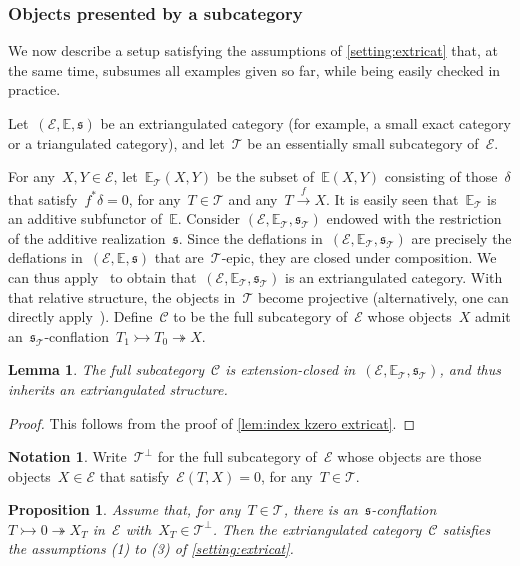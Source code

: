 \documentclass{amsart}
\newtheorem{proposition}[theorem]{Proposition}
\newtheorem{lemma}[theorem]{Lemma}
\theoremstyle{definition}
\newtheorem{notation}[theorem]{Notation}
\newcommand{\cat}{\mathcal{C}}
\newcommand{\tc}{\mathcal{T}}
\newcommand{\ec}{\mathcal{E}}
\newcommand{\infl}{\rightarrowtail}
\newcommand{\defl}{\twoheadrightarrow}
\begin{document}
\subsubsection{Objects presented by a subcategory}
\label{sec:prT}

We now describe a setup satisfying the assumptions of \cref{setting:extricat} that, at the same time, subsumes all examples given so far, while being easily checked in practice.

Let~$(\ec,\mathbb{E},\mathfrak{s})$ be an extriangulated category (for example, a small exact category or a triangulated category), and let~$\tc$ be an essentially small subcategory of~$\ec$.

For any~$X,Y\in\ec$, let~$\mathbb{E}_\tc(X,Y)$ be the subset of~$\mathbb{E}(X,Y)$ consisting of those~$\delta$ that satisfy~$f^\ast\delta = 0$, for any~$T\in\tc$ and any~$T\xrightarrow{f}X$.
It is easily seen that~$\mathbb{E}_\tc$ is an additive subfunctor of~$\mathbb{E}$.
Consider $(\ec,\mathbb{E}_\tc,\mathfrak{s}_\tc)$ endowed with the restriction of the additive realization~$\mathfrak{s}$.
Since the deflations in~$(\ec,\mathbb{E}_\tc,\mathfrak{s}_\tc)$ are precisely the deflations in~$(\ec,\mathbb{E},\mathfrak{s})$ that are~$\tc$-epic, they are closed under composition.
We can thus apply~\cite[Prop.~3.16]{HerschendLiuNakaokaI} to obtain that~$(\ec,\mathbb{E}_\tc,\mathfrak{s}_\tc)$ is an extriangulated category.
With that relative structure, the objects in~$\tc$ become projective
(alternatively, one can directly apply~\cite[Prop.~3.19]{HerschendLiuNakaokaI}).
Define~$\cat$ to be the full subcategory of~$\ec$ whose objects~$X$ admit an~$\mathfrak{s}_\tc$-conflation~$T_1\infl T_0\defl X$.

\begin{lemma}
\label{lem: prT is extriangulated}
The full subcategory~$\cat$ is extension-closed in~$(\ec,\mathbb{E}_\tc,\mathfrak{s}_\tc)$, and thus inherits an extriangulated structure.
\end{lemma}

\begin{proof}
This follows from the proof of \cref{lem:index kzero extricat}.
\end{proof}

\begin{notation}
Write~$\tc^\perp$ for the full subcategory of~$\ec$ whose objects are those objects~$X\in\ec$ that satisfy~$\ec(T,X)=0$, for any~$T\in\tc$.
\end{notation}

\begin{proposition}
\label{prop:prT}
Assume that, for any~$T\in\tc$, there is an~$\mathfrak{s}$-conflation~$T\infl 0\defl X_T$ in~$\ec$ with~$X_T\in\tc^\perp$.
Then the extriangulated category~$\cat$ satisfies the assumptions (1) to (3) of \cref{setting:extricat}.
\end{proposition}
\end{document}
